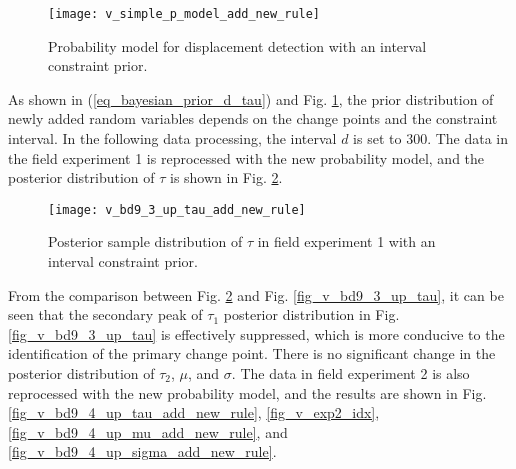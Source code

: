 \documentclass[final,3p,times]{elsarticle}
\begin{document}
	\begin{figure}[H]
		\centering
		\texttt{[image: v\_simple\_p\_model\_add\_new\_rule]}
		\caption{ \textcolor{r_s}{Probability} model for displacement detection with an interval constraint prior.}
		\label{fig_v_simple_p_model_add_new_rule}
	\end{figure} 
	As shown in (\ref{eq_bayesian_prior_d_tau}) and Fig. \ref{fig_v_simple_p_model_add_new_rule}, the prior distribution of newly added random variables depends on the change points and the constraint interval. 
	In the following data processing, the interval $d$ is set to 300.
	The data in \textcolor{r_s}{the} field experiment 1 is reprocessed with the new \textcolor{r_s}{probability} model, and the posterior distribution of $\tau$ is shown in Fig. \ref{fig_v_bd9_3_up_tau_add_new_rule}.
	
	\begin{figure}[htbp]
		\centering
		\texttt{[image: v\_bd9\_3\_up\_tau\_add\_new\_rule]}
		\caption{Posterior sample distribution of $\tau$ in field experiment 1 with an interval constraint prior.}
		\label{fig_v_bd9_3_up_tau_add_new_rule}
	\end{figure} 
	
	From the comparison between Fig. \ref{fig_v_bd9_3_up_tau_add_new_rule} and Fig. \ref{fig_v_bd9_3_up_tau}, it can be seen that the secondary peak of $\tau_1$ posterior distribution in Fig. \ref{fig_v_bd9_3_up_tau} is effectively suppressed, which is more conducive to the identification of the primary change point. 
	There is no significant change in the posterior distribution of $\tau_2$, $\mu$, and  $\sigma$.
	The data in field experiment 2 is also reprocessed with the new \textcolor{r_s}{probability} model, and the results are shown in Fig. \ref{fig_v_bd9_4_up_tau_add_new_rule}, \ref{fig_v_exp2_idx}, \ref{fig_v_bd9_4_up_mu_add_new_rule}, and \ref{fig_v_bd9_4_up_sigma_add_new_rule}.
	
\end{document}
